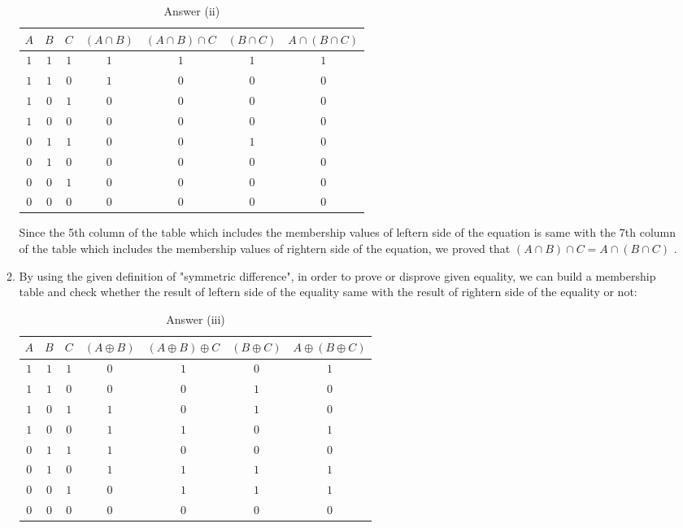 \documentclass[11pt]{article}
\begin{document}
\begin{enumerate}
\begin{enumerate}
	\begin{table}[H]
		\centering
		\caption{Answer (ii)}
		\vspace{5px}
		\begin{tabular}{|c|c|c|c|c|c|c|}
			\hline
			$A$&$B$&$C$&$(A \cap B)$&$(A \cap B)\cap C$&$(B \cap C)$&$A \cap (B \cap C)$\\ \hline
			$1$&$1$&$1$&$1$&$1$&$1$&$1$\\ \hline
			$1$&$1$&$0$&$1$&$0$&$0$&$0$\\ \hline
			$1$&$0$&$1$&$0$&$0$&$0$&$0$\\ \hline
			$1$&$0$&$0$&$0$&$0$&$0$&$0$\\ \hline
			$0$&$1$&$1$&$0$&$0$&$1$&$0$\\ \hline
			$0$&$1$&$0$&$0$&$0$&$0$&$0$\\ \hline
			$0$&$0$&$1$&$0$&$0$&$0$&$0$\\ \hline
			$0$&$0$&$0$&$0$&$0$&$0$&$0$\\ \hline
			
			
		\end{tabular}
	\end{table}  
	
	Since the 5th column of the table which includes the membership values of leftern side of the equation is same with the 7th column of the table which includes the membership values of rightern side of the equation, we proved that $(A \cap B)\cap C = A \cap (B \cap C)$ .
	
	\item 
	
	By using the given definition of "symmetric difference", in order to prove or disprove given equality, we can build a membership table and check whether the result of leftern side of the equality same with the result of rightern side of the equality or not:
	
	\begin{table}[H]
		\centering
		\caption{Answer (iii)}
		\vspace{5px}
		\begin{tabular}{|c|c|c|c|c|c|c|}
			\hline
			$A$&$B$&$C$&$(A \oplus B)$&$(A \oplus B)\oplus C$&$(B \oplus C)$&$A \oplus (B \oplus C)$\\ \hline
			$1$&$1$&$1$&$0$&$1$&$0$&$1$\\ \hline
			$1$&$1$&$0$&$0$&$0$&$1$&$0$\\ \hline
			$1$&$0$&$1$&$1$&$0$&$1$&$0$\\ \hline
			$1$&$0$&$0$&$1$&$1$&$0$&$1$\\ \hline
			$0$&$1$&$1$&$1$&$0$&$0$&$0$\\ \hline
			$0$&$1$&$0$&$1$&$1$&$1$&$1$\\ \hline
			$0$&$0$&$1$&$0$&$1$&$1$&$1$\\ \hline
			$0$&$0$&$0$&$0$&$0$&$0$&$0$\\ \hline
			

\end{tabular}
\end{table}
\end{enumerate}
\end{enumerate}
\end{document}
